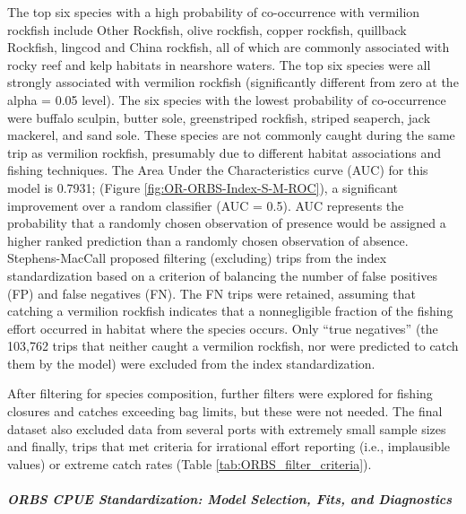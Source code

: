 \documentclass[11pt,
  english,
  a4paper,
]{article}
\begin{document}
The top six species with a high probability of co-occurrence with vermilion rockfish include Other Rockfish, olive rockfish, copper rockfish, quillback Rockfish, lingcod and China rockfish, all of which are commonly associated with rocky reef and kelp habitats in nearshore waters. The top six species were all strongly associated with vermilion rockfish (significantly different from zero at the alpha = 0.05 level). The six species with the lowest probability of co-occurrence were buffalo sculpin, butter sole, greenstriped rockfish, striped seaperch, jack mackerel, and sand sole. These species are not commonly caught during the same trip as vermilion rockfish, presumably due to different habitat associations and fishing techniques. The Area Under the Characteristics curve (AUC) for this model is 0.7931; (Figure \ref{fig:OR-ORBS-Index-S-M-ROC}), a significant improvement over a random classifier (AUC = 0.5). AUC represents the probability that a randomly chosen observation of presence would be assigned a higher ranked prediction than a randomly chosen observation of absence. Stephens-MacCall proposed filtering (excluding) trips from the index standardization based on a criterion of balancing the number of false positives (FP) and false negatives (FN). The FN trips were retained, assuming that catching a vermilion rockfish indicates that a nonnegligible fraction of the fishing effort occurred in habitat where the species occurs. Only ``true negatives'' (the 103,762 trips that neither caught a vermilion rockfish, nor were predicted to catch them by the model) were excluded from the index standardization.

\leavevmode\tagmcend\tagstructend\par


After filtering for species composition, further filters were explored for fishing closures and catches exceeding bag limits, but these were not needed. The final dataset also excluded data from several ports with extremely small sample sizes and finally, trips that met criteria for irrational effort reporting (i.e., implausible values) or extreme catch rates (Table \ref{tab:ORBS_filter_criteria}).

\leavevmode\tagmcend\tagstructend\par


\hypertarget{orbs-cpue-standardization-model-selection-fits-and-diagnostics}{%
\subparagraph{ORBS CPUE Standardization: Model Selection, Fits, and Diagnostics}\label{orbs-cpue-standardization-model-selection-fits-and-diagnostics}}
\end{document}
